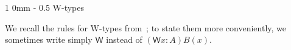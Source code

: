 \documentclass[10pt,a4paper,oneside,reqno]{amsart}
\makeatletter
\numberwithin{equation}{section}
\renewcommand{\section}{\@startsection
  {section}%
   {1}%
  {0mm}%
   {-\baselineskip}%
  {0.5\baselineskip}%
   {\Large\bfseries}}%
\theoremstyle{mythm}
\theoremstyle{mydef}
\theoremstyle{myrmk}
\newcommand{\W}{\mathsf{W}}
\newcommand{\wsup}{\mathsf{sup}}
\newcommand{\wind}{\mathsf{wind}}
\newcommand{\UU}{\mathsf{U}}
\makeatother
\begin{document}

\newpage
\section{W-types}
\label{section:wfiles}



We recall the rules for W-types from~\cite{MartinLofP:inttt}; to state them more conveniently, we sometimes write simply $\W$ instead of $(\W{x : A})B(x)$.
\end{document}

